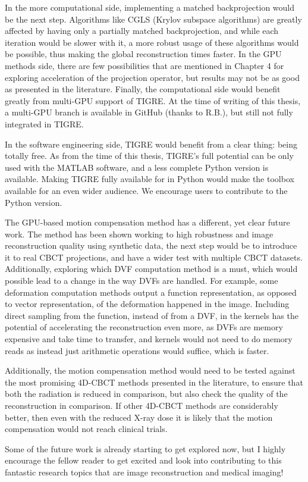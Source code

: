In the more computational side, implementing a matched backprojection would be the next step. Algorithms like CGLS (Krylov subspace algorithms) are greatly affected by having only a partially matched backprojection, and while each iteration would be slower with it, a more robust usage of these algorithms would be possible, thus making the global reconstruction times faster. In the GPU methods side, there are few possibilities that are mentioned in Chapter 4 for exploring acceleration of the projection operator, but results may not be as good as presented in the literature. Finally, the computational side would benefit greatly from multi-GPU support of TIGRE. At the time of writing of this thesis, a multi-GPU branch is available in GitHub (thanks to R.B.), but still not fully integrated in TIGRE.

In the software engineering side, TIGRE would benefit from a clear thing: being totally free. As from the time of this thesis, TIGRE's full potential can be only used with the MATLAB software, and a less complete Python version is available. Making TIGRE fully available for in Python would make the toolbox available for an even wider audience. We encourage users to contribute to the Python version.

The GPU-based motion compensation method has a different, yet clear future work. The method has been shown working to high robustness and image reconstruction quality using synthetic data, the next step would be to introduce it to real CBCT projections,  and have a wider test with multiple CBCT datasets. Additionally, exploring which DVF computation method is a must, which would possible lead to a change in the way DVFs are handled. For example, some deformation computation methods output a function representation, as opposed to vector representation, of the deformation happened in the image. Including direct sampling from the function, instead of from a DVF, in the kernels has the potential of accelerating the reconstruction even more, as DVFs are memory expensive and take time to transfer, and kernels would not need to do memory reads as instead just arithmetic operations would suffice, which is faster.

Additionally, the motion compensation method would need to be tested against the most promising  4D-CBCT methods presented in the literature, to ensure that both the radiation is reduced in comparison, but also check the quality of the reconstruction in comparison. If other 4D-CBCT methods are considerably better, then even with the reduced X-ray dose it is likely that the motion compensation would not reach clinical trials.

Some of the future work is already starting to get explored now, but I highly encourage the fellow reader to get excited and look into contributing to this fantastic research topics that are image reconstruction and medical imaging!

